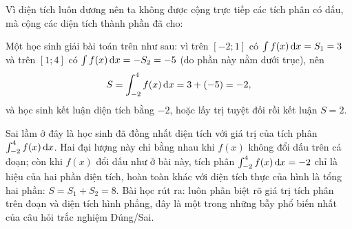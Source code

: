 \begin{center}
\end{center}



\begin{loigiai}
Vì diện tích luôn dương nên ta không được cộng trực tiếp các tích phân có dấu, mà cộng các diện tích thành phần đã cho:
\end{loigiai}

\begin{hopsailam}
Một học sinh giải bài toán trên như sau: vì trên $[-2;1]$ có $\int f(x)\,\mathrm{d}x = S_1 = 3$ và trên $[1;4]$ có $\int f(x)\,\mathrm{d}x = -S_2 = -5$ (do phần này nằm dưới trục), nên
\[
S = \int_{-2}^4 f(x)\,\mathrm{d}x = 3+(-5) = -2,
\]
và học sinh kết luận diện tích bằng $-2$, hoặc lấy trị tuyệt đối rồi kết luận $S=2$.

Sai lầm ở đây là học sinh đã đồng nhất diện tích với giá trị của tích phân $\int_{-2}^4 f(x)\,\mathrm{d}x$. Hai đại lượng này chỉ bằng nhau khi $f(x)$ không đổi dấu trên cả đoạn; còn khi $f(x)$ đổi dấu như ở bài này, tích phân $\int_{-2}^4 f(x)\,\mathrm{d}x=-2$ chỉ là hiệu của hai phần diện tích, hoàn toàn khác với diện tích thực của hình là tổng hai phần: $S=S_1+S_2=8$. Bài học rút ra: luôn phân biệt rõ giá trị tích phân trên đoạn và diện tích hình phẳng, đây là một trong những bẫy phổ biến nhất của câu hỏi trắc nghiệm Đúng/Sai.
\end{hopsailam}

